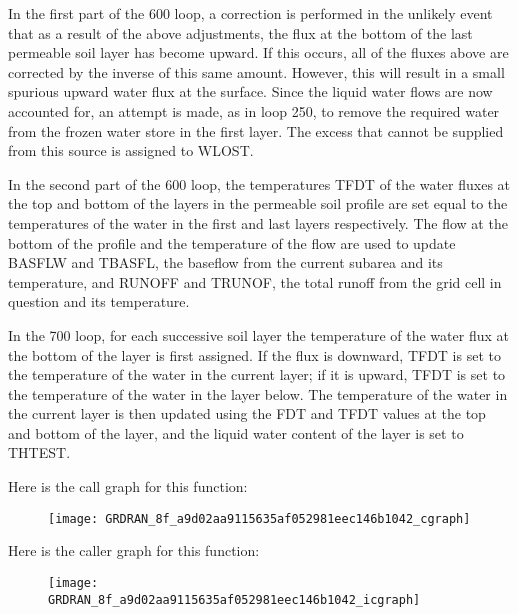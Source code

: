 In the first part of the 600 loop, a correction is performed in the unlikely event that as a result of the above adjustments, the flux at the bottom of the last permeable soil layer has become upward. If this occurs, all of the fluxes above are corrected by the inverse of this same amount. However, this will result in a small spurious upward water flux at the surface. Since the liquid water flows are now accounted for, an attempt is made, as in loop 250, to remove the required water from the frozen water store in the first layer. The excess that cannot be supplied from this source is assigned to W\+L\+O\+S\+T.

In the second part of the 600 loop, the temperatures T\+F\+D\+T of the water fluxes at the top and bottom of the layers in the permeable soil profile are set equal to the temperatures of the water in the first and last layers respectively. The flow at the bottom of the profile and the temperature of the flow are used to update B\+A\+S\+F\+L\+W and T\+B\+A\+S\+F\+L, the baseflow from the current subarea and its temperature, and R\+U\+N\+O\+F\+F and T\+R\+U\+N\+O\+F, the total runoff from the grid cell in question and its temperature.

In the 700 loop, for each successive soil layer the temperature of the water flux at the bottom of the layer is first assigned. If the flux is downward, T\+F\+D\+T is set to the temperature of the water in the current layer; if it is upward, T\+F\+D\+T is set to the temperature of the water in the layer below. The temperature of the water in the current layer is then updated using the F\+D\+T and T\+F\+D\+T values at the top and bottom of the layer, and the liquid water content of the layer is set to T\+H\+T\+E\+S\+T.

Here is the call graph for this function\+:\nopagebreak
\begin{figure}[H]
\begin{center}
\leavevmode
\texttt{[image: GRDRAN\_8f\_a9d02aa9115635af052981eec146b1042\_cgraph]}
\end{center}
\end{figure}




Here is the caller graph for this function\+:\nopagebreak
\begin{figure}[H]
\begin{center}
\leavevmode
\texttt{[image: GRDRAN\_8f\_a9d02aa9115635af052981eec146b1042\_icgraph]}
\end{center}
\end{figure}



